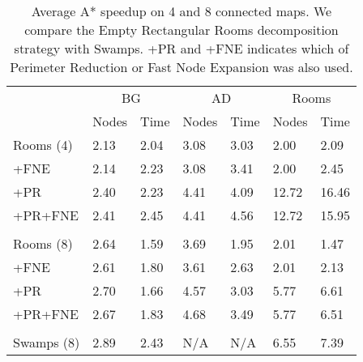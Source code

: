 \begin{table}[tb]
\caption{Average A* speedup on 4 and 8 connected maps.
We compare the Empty Rectangular Rooms decomposition strategy with Swamps.
+PR and +FNE indicates which of Perimeter Reduction or Fast Node Expansion was also used.}
\label{table-speedup}


\begin{center}
\begin{tabular*}{\columnwidth}{p{1.8cm}m{0.62cm}m{0.62cm}m{0.62cm}m{0.62cm}m{0.62cm}m{0.62cm}}
  \hline
   & \multicolumn{2}{c}{BG} & \multicolumn{2}{c}{AD} & \multicolumn{2}{c}{Rooms}\\
	& Nodes & Time & Nodes & Time & Nodes & Time \\
  \hline

	Rooms (4) & 2.13 & 2.04 & 3.08 & 3.03 & 2.00 & 2.09 \\ 
	+FNE  & 2.14 & 2.23 & 3.08 & 3.41 & 2.00 & 2.45 \\ 
	+PR  & 2.40 & 2.23 & 4.41 & 4.09 & 12.72 & 16.46 \\ 
	+PR+FNE & 2.41 & 2.45 & 4.41 & 4.56 & 12.72 & 15.95 \\  \\ 
	Rooms (8) & 2.64 & 1.59 & 3.69 & 1.95 & 2.01 & 1.47 \\ 
	+FNE  & 2.61 & 1.80 & 3.61 & 2.63 & 2.01 & 2.13 \\ 
	+PR  & 2.70 & 1.66 & 4.57 & 3.03 & 5.77 & 6.61 \\ 
	+PR+FNE  & 2.67 & 1.83 & 4.68 & 3.49 & 5.77 & 6.51 \\  \\
	Swamps (8) & 2.89 & 2.43 & N/A & N/A & 6.55 & 7.39 \\ 
   \hline
\end{tabular*}
\end{center}
\end{table}
